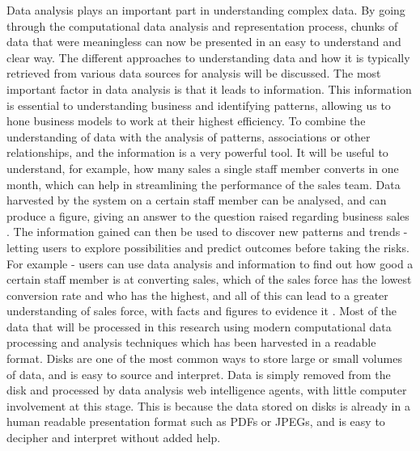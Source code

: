 Data analysis plays an important part in understanding complex data. By going through the computational data analysis and representation process, chunks of data that were meaningless can now be presented in an easy to understand and clear way. The different approaches to understanding data and how it is typically retrieved from various data sources for analysis will be discussed. The most important factor in data analysis is that it leads to information. This information is essential to understanding business and identifying patterns, allowing us to hone business models to work at their highest efficiency. To combine the understanding of data with the analysis of patterns, associations or other relationships, and the information is a very powerful tool. It will be useful to understand, for example, how many sales a single staff member converts in one month, which can help in streamlining the performance of the sales team. Data harvested by the system on a certain staff member can be analysed, and can produce a figure, giving an answer to the question raised regarding business sales \cite{hair2006multivariate}. The information gained can then be used to discover new patterns and trends - letting users to explore possibilities and predict outcomes before taking the risks. For example - users can use data analysis and information to find out how good a certain staff member is at converting sales, which of the sales force has the lowest conversion rate and who has the highest, and all of this can lead to a greater understanding of sales force, with facts and figures to  evidence it \cite{larose2014discovering}. Most of the data that will be processed in this research using modern computational data processing and analysis techniques which has been harvested in a readable format. Disks are one of the most common ways to store large or small volumes of data, and is easy to source and interpret. Data is simply removed from the disk and processed by data analysis web intelligence agents, with little computer involvement at this stage. This is because the data stored on disks is already in a human readable presentation format such as PDFs or JPEGs, and is easy to decipher and interpret without added help.  

